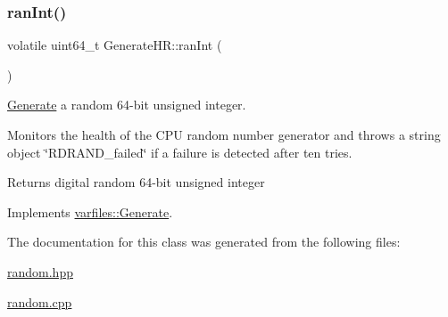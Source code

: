 \subsubsection{\texorpdfstring{ran\+Int()}{ranInt()}}
{\footnotesize\ttfamily volatile uint64\+\_\+t Generate\+H\+R\+::ran\+Int (\begin{DoxyParamCaption}{ }\end{DoxyParamCaption})\hspace{0.3cm}{\ttfamily [virtual]}}



\hyperlink{classvarfiles_1_1_generate}{Generate} a random 64-\/bit unsigned integer. 

Monitors the health of the C\+PU random number generator and throws a {\ttfamily string} object \char`\"{}\+R\+D\+R\+A\+N\+D\+\_\+failed\char`\"{} if a failure is detected after ten tries.

\begin{DoxyReturn}{Returns}
digital random 64-\/bit unsigned integer 
\end{DoxyReturn}


Implements \hyperlink{classvarfiles_1_1_generate_a8cac7a586f21a0def82cd68c379f9f86}{varfiles\+::\+Generate}.



The documentation for this class was generated from the following files\+:\begin{DoxyCompactItemize}
\item 
\hyperlink{random_8hpp}{random.\+hpp}\item 
\hyperlink{random_8cpp}{random.\+cpp}\end{DoxyCompactItemize}
